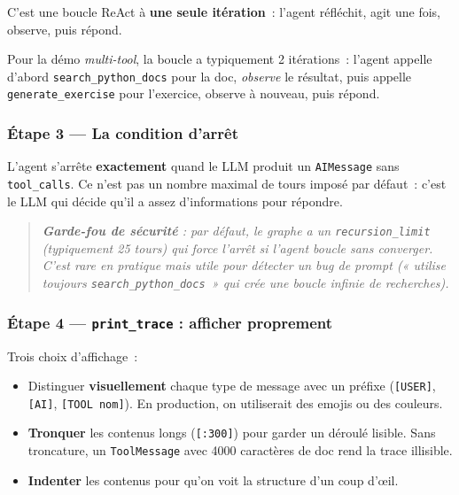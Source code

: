 \documentclass[11pt,a4paper]{article}
\begin{document}
C'est une boucle ReAct à \textbf{une seule itération}~: l'agent réfléchit,
agit une fois, observe, puis répond.

Pour la démo \emph{multi-tool}, la boucle a typiquement 2 itérations~:
l'agent appelle d'abord \texttt{search\_python\_docs} pour la doc,
\emph{observe} le résultat, puis appelle \texttt{generate\_exercise}
pour l'exercice, observe à nouveau, puis répond.

\subsubsection*{Étape 3 — La condition d'arrêt}

L'agent s'arrête \textbf{exactement} quand le LLM produit un
\texttt{AIMessage} sans \texttt{tool\_calls}. Ce n'est pas un nombre
maximal de tours imposé par défaut~: c'est le LLM qui décide qu'il a
assez d'informations pour répondre.

\begin{quote}\itshape
\textbf{Garde-fou de sécurité} : par défaut, le graphe a un
\texttt{recursion\_limit} (typiquement 25 tours) qui force l'arrêt si
l'agent boucle sans converger. C'est rare en pratique mais utile pour
détecter un bug de prompt (« utilise toujours \texttt{search\_python\_docs}~»
qui crée une boucle infinie de recherches).
\end{quote}

\subsubsection*{Étape 4 — \texttt{print\_trace} : afficher proprement}

Trois choix d'affichage~:

\begin{itemize}[leftmargin=*]
  \item Distinguer \textbf{visuellement} chaque type de message avec un
        préfixe (\texttt{[USER]}, \texttt{[AI]}, \texttt{[TOOL nom]}).
        En production, on utiliserait des emojis ou des couleurs.
  \item \textbf{Tronquer} les contenus longs (\texttt{[:300]}) pour
        garder un déroulé lisible. Sans troncature, un \texttt{ToolMessage}
        avec 4000 caractères de doc rend la trace illisible.
  \item \textbf{Indenter} les contenus pour qu'on voit la structure
        d'un coup d'œil.
\end{itemize}
\end{document}
